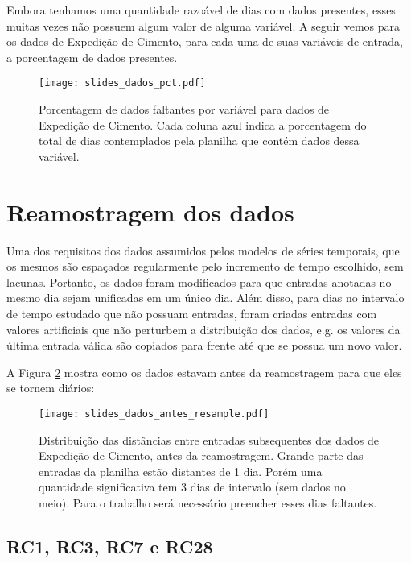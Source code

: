Embora tenhamos uma quantidade razoável de dias com dados presentes, esses muitas vezes não possuem algum valor de alguma variável.
A seguir vemos para os dados de Expedição de Cimento, para cada uma de suas variáveis de entrada, a porcentagem de dados presentes. 


\begin{figure}[H]
  \centering
  \texttt{[image: slides\_dados\_pct.pdf]}
  \caption{Porcentagem de dados faltantes por variável para dados de Expedição
    de Cimento. Cada coluna azul indica a porcentagem do total de dias contemplados
    pela planilha que contém dados dessa variável.}
  \label{fig:dadosfalta}
\end{figure}


\section{Reamostragem dos dados}

Uma dos requisitos dos dados assumidos pelos modelos de séries temporais, que os mesmos
são espaçados regularmente pelo incremento de tempo escolhido, sem lacunas.
Portanto, os dados foram modificados para que entradas anotadas no mesmo dia
sejam unificadas em um único dia. Além disso, para dias no intervalo de tempo
estudado que não possuam entradas, foram criadas entradas com valores
artificiais que não perturbem a distribuição dos dados, e.g. os valores da
última entrada válida são copiados para frente até que se possua um novo valor.

A Figura \ref{fig:reamos} mostra como os dados estavam antes da reamostragem
para que eles se tornem diários: 

\begin{figure}[H]
  \centering
  \texttt{[image: slides\_dados\_antes\_resample.pdf]}
  \caption{Distribuição das distâncias entre entradas subsequentes dos dados de
    Expedição de Cimento, antes da reamostragem. Grande parte das entradas da
    planilha estão distantes de 1 dia. Porém uma quantidade significativa tem 3
    dias de intervalo (sem dados no meio). Para o trabalho será necessário
    preencher esses dias faltantes.}
  \label{fig:reamos}
\end{figure}



\subsection{RC1, RC3, RC7 e RC28}

